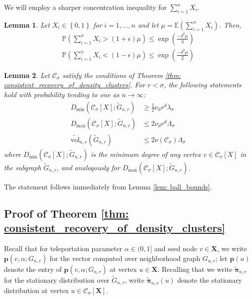 \documentclass{article}
\let\pprspace\relax
\newcommand{\set}[1]{\left\{#1\right\}}
\newcommand{\vol}{\mathrm{vol}}
\newcommand{\1}{\mathbf{1}}
\newcommand{\pbf}{\mathbf{p}}
\newcommand{\pibf}{\bm{\pi}}
\newcommand{\Xbf}{\mathbf{X}}
\newcommand{\Pbb}{\mathbb{P}}
\newcommand{\Ebb}{\mathbb{E}}
\newcommand{\Cset}{\mathcal{C}}
\newcommand{\Csig}{\Cset_{\sigma}}
\newcommand{\pprspace}{{\sc PPR~}}
\theoremstyle{aldenthm}
\newtheorem{lemma}{Lemma}
\begin{document}
We will employ a sharper concentration inequality for $\sum_{i = 1}^{n} X_i$.
\begin{lemma}
	\label{lem: multiplicative_Hoeffding}
	Let $X_i \in \set{0,1}$ for $i = 1, \ldots, n$ and let $\mu = \Ebb(\sum_{i = 1}^n X_i)$. Then,
	\begin{align*}
	\Pbb\left(\sum_{i=1}^{n}X_i > (1 + \epsilon) \mu \right) \leq \exp \left(\frac{-\delta^2 \mu}{3}\right) \\
	\Pbb\left(\sum_{i=1}^{n}X_i < (1 - \epsilon) \mu \right) \leq \exp \left(\frac{-\delta^2 \mu}{2}\right)
	\end{align*}
\end{lemma}

\begin{lemma}
	\label{lem: ball_bounds_in_probability}
	Let $\Csig$ satisfy the conditions of Theorem \ref{thm: consistent_recovery_of_density_clusters}. For $r < \sigma$, the following statements hold with probability tending to one as $n \to \infty$:
	\begin{align*}
	D_{\min}(\Csig[X]; \widetilde{G}_{n,r}) & \geq \frac{1}{2} \nu_d r^d \lambda_{\sigma} \\
	D_{\max}(\Csig[X]; \widetilde{G}_{n,r}) & \leq 2 \nu_d r^d \Lambda_{\sigma} \\
	\widetilde{\vol}_{n,r}(\widetilde{G}_{n,r}) & \leq 2 \nu(\Csig) \Lambda_{\sigma}
	\end{align*}
	where $D_{\min}(\Csig[X]; \widetilde{G}_{n,r})$ is the minimum degree of any vertex $v \in \Csig[X]$ in the subgraph $\widetilde{G}_{n,r}$, and analogously for $D_{\max}(\Csig[X]; \widetilde{G}_{n,r})$.
\end{lemma}

The statement follows immediately from Lemma \ref{lem: ball_bounds}.

\subsection{Proof of Theorem \ref{thm: consistent_recovery_of_density_clusters}}
\label{sec: proof_of_consistent_cluster_recovery}

Recall that for teleportation parameter $\alpha  \in (0,1]$ and seed node $v \in \Xbf$, we write $\pbf(v, \alpha; G_{n,r})$ for the \pprspace vector computed over neighborhood graph $G_{n,r}$; let $\pbf(u)$ denote the entry of $\pbf(v, \alpha; G_{n,r})$ at vertex $u \in \Xbf$. 
Recalling that we write $\widetilde{\pibf}_{n,r}$ for the stationary distribution over $\widetilde{G}_{n,r}$, write $\widetilde{\pibf}_{n,r}(u)$ denote the stationary distribution at vertex $u \in \Csig[\Xbf]$. 
\end{document}
